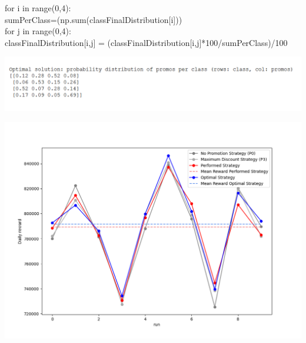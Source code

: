 \begin{enumerate}
	for i in range(0,4):\\
	\tabto{0.6cm}sumPerClass=(np.sum(classFinalDistribution[i]))\\
	\tabto{0.6cm}for j in range(0,4):\\
	\tabto{1.2cm}classFinalDistribution[i,j] = (classFinalDistribution[i,j]*100/sumPerClass)/100 \\
	
	
	
\end{enumerate}
  
\begin{center}
	\includegraphics[scale=0.9]{Images/n1_results}
\end{center}
\begin{center}
	\includegraphics[scale=0.7]{Images/n1_chart}
\end{center}





